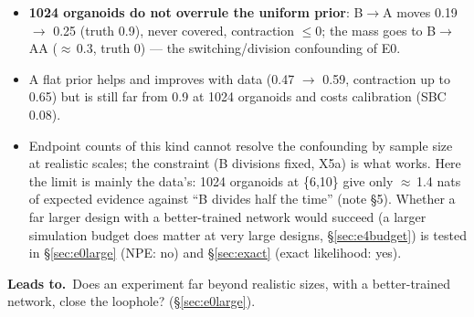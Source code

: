\documentclass[10pt,a4paper]{article}
\newcommand{\blk}[1]{\par\needspace{5\baselineskip}\smallskip{\sffamily\bfseries\color{inkgray}#1}\par}
\newcommand{\Comment}{\blk{Comment}}
\newcommand{\Leads}[1]{\begin{leadbox}{\sffamily\bfseries\color{caqua!70!black}Leads to.}\ #1\end{leadbox}}
\renewcommand{\blk}[1]{\par\Needspace*{5\baselineskip}\smallskip{\sffamily\bfseries\color{inkgray}#1}\par}
\newcommand{\sref}[1]{\S\ref{#1}}
\begin{document}
\Comment
\begin{itemize}
\item \textbf{1024 organoids do not overrule the uniform prior}: B$\to$A moves 0.19 $\to$ 0.25 (truth 0.9), never covered, contraction $\le 0$; the mass goes to B$\to$AA ($\approx$\,0.3, truth 0) --- the switching/division confounding of E0.
\item A flat prior helps and improves with data (0.47 $\to$ 0.59, contraction up to 0.65) but is still far from 0.9 at 1024 organoids and costs calibration (SBC 0.08).
\item Endpoint counts of this kind cannot resolve the confounding by sample size at realistic scales; the constraint (B divisions fixed, X5a) is what works. Here the limit is mainly the data's: 1024 organoids at \{6,10\} give only $\approx$\,1.4 nats of expected evidence against ``B divides half the time'' (note \S5). Whether a far larger design with a better-trained network would succeed (a larger simulation budget does matter at very large designs, \sref{sec:e4budget}) is tested in \sref{sec:e0large} (NPE: no) and \sref{sec:exact} (exact likelihood: yes).
\end{itemize}
\Leads{Does an experiment far beyond realistic sizes, with a better-trained network, close the loophole? (\sref{sec:e0large}).}
\end{document}
